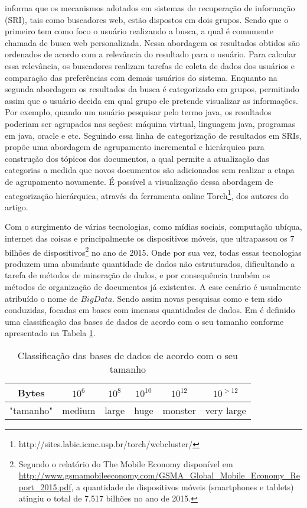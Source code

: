 \cite{Matsumoto10} informa que os mecanismos adotados em sistemas de recuperação de informação
(SRI), tais como buscadores web, estão dispostos em dois grupos. Sendo que o primeiro tem como foco
o usuário realizando a busca, a qual é comumente chamada de busca web personalizada.  Nessa
abordagem os resultados obtidos são ordenados de acordo com a relevância do resultado para o
usuário. Para calcular essa relevância, os buscadores realizam tarefas de coleta de dados dos
usuários e comparação das preferências com demais usuários do sistema.  Enquanto na segunda
abordagem os resultados da busca é categorizado em grupos, permitindo assim que o usuário decida em
qual grupo ele pretende visualizar as informações. Por exemplo, quando um usuário pesquisar pelo
termo java, os resultados poderiam ser agrupados nas seções: máquina virtual, linguagem java,
programas em java, oracle e etc. Seguindo essa linha de categorização de resultados em SRIs,
\cite{MarcaciniR10} propõe uma abordagem de agrupamento incremental e hierárquico para construção
dos tópicos dos documentos, a qual permite a atualização das categorias a medida que novos
documentos são adicionados sem realizar a etapa de agrupamento novamente. É possível a visualização
dessa abordagem de categorização hierárquica, através da ferramenta online
Torch\footnote{http://sites.labic.icmc.usp.br/torch/webcluster/}, dos autores do artigo.

Com o surgimento de várias tecnologias, como mídias sociais, computação ubíqua, internet das coisas 
e principalmente os dispositivos móveis, que ultrapassou os 7 bilhões de
dispositivos\footnote{Segundo o relatório do The Mobile Economy disponível em
\url{http://www.gsmamobileeconomy.com/GSMA_Global_Mobile_Economy_Report_2015.pdf}, a quantidade de
dispositivos móveis (smartphones e tablets) atingiu o total de 7,517 bilhões no ano de 2015.} no ano
de 2015. Onde por sua vez, todas essas tecnologias produzem uma abundante quantidade de dados não
estruturados, dificultando a tarefa de métodos de mineração de dados, e por consequência
também os métodos de organização de documentos já existentes. A esse cenário é usualmente atribuído
o nome de $Big Data$. Sendo assim novas pesquisas como \cite{Havens2012} e \cite{Kumar2015} tem 
sido conduzidas, focadas em bases com imensas quantidades de dados. Em \cite{Havens2012} é definido
uma classificação das bases de dados de acordo com o seu tamanho conforme apresentado na Tabela
\ref{table:datasize}.

\begin{table}[!htp]
  \centering
  \begin{tabular}{ |c|c c c c c|}
    \hline
    Bytes & $10^6$ & $10^8$ & $10^{10}$ & $10^{12}$ & $10^{>12}$ \\
    \hline
    "tamanho" & medium & large & huge & monster & very large \\
    \hline
  \end{tabular}
  \label{table:datasize}
  \caption{Classificação das bases de dados de acordo com o seu tamanho\cite{Havens2012}}
\end{table}
